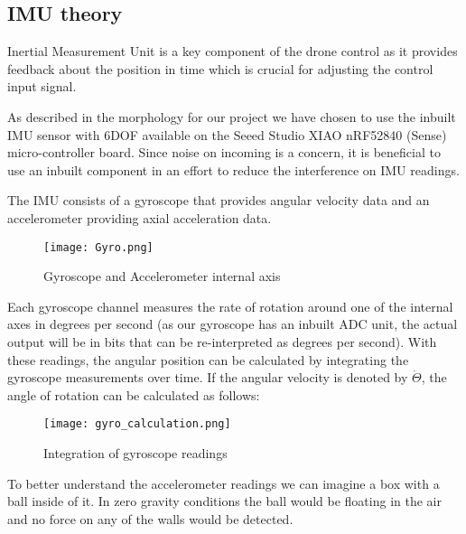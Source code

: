 \usepackage{graphicx} %
\usepackage{float}





\subsection{IMU theory}

Inertial Measurement Unit is a key component of the drone control as it provides feedback about the position in time which is crucial for adjusting the control input signal.

As described in the morphology for our project we have chosen to use the inbuilt IMU sensor with 6DOF available on the Seeed Studio XIAO nRF52840 (Sense) micro-controller board. Since noise on incoming is a concern, it is beneficial to use an inbuilt component in an effort to reduce the interference on IMU readings.

The IMU consists of a gyroscope that provides angular velocity
data and an accelerometer providing axial acceleration data.

\begin{figure}[H]
    \begin{center}
    \texttt{[image: Gyro.png]}
    \end{center}
    \caption{Gyroscope and Accelerometer internal axis}
    \label{fig:my_label}
\end{figure}


Each gyroscope channel measures the rate of rotation around one of the internal axes in degrees per second (as our gyroscope has an inbuilt ADC unit, the actual output will be in bits that can be re-interpreted as degrees per second). With these readings, the angular position can be calculated by integrating the gyroscope measurements over time. If the angular velocity is denoted by $\dot{\Theta}$, the angle of rotation can be calculated as follows:

\begin{figure}[H]
    \begin{center}
    \texttt{[image: gyro\_calculation.png]}
    \end{center}
    \caption{Integration of gyroscope readings}
    \label{fig:my_label}
\end{figure}


To better understand the accelerometer readings we can imagine a box with a ball inside of it. In zero gravity conditions the ball would be floating in the air and no force on any of the walls would be detected.


